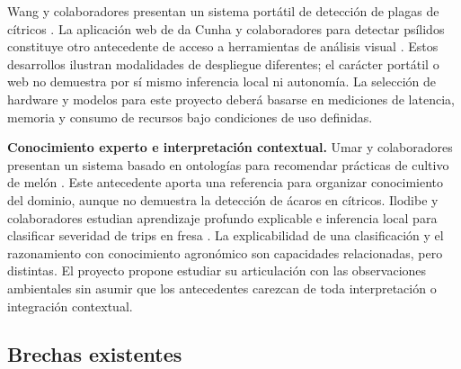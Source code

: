 Wang y colaboradores presentan un sistema portátil de detección de plagas de
cítricos \cite{wang2021portable}. La aplicación web de da Cunha y colaboradores
para detectar psílidos constituye otro antecedente de acceso a herramientas
de análisis visual \cite{cunha2024psyllid}. Estos desarrollos ilustran
modalidades de despliegue diferentes; el carácter portátil o web no demuestra
por sí mismo inferencia local ni autonomía. La selección de hardware y modelos
para este proyecto deberá basarse en mediciones de latencia, memoria y consumo
de recursos bajo condiciones de uso definidas.

\textbf{Conocimiento experto e interpretación contextual.}
Umar y colaboradores presentan un sistema basado en ontologías para recomendar
prácticas de cultivo de melón \cite{umar2024ontology}. Este antecedente aporta
una referencia para organizar conocimiento del dominio, aunque no demuestra
la detección de ácaros en cítricos. Ilodibe y colaboradores estudian aprendizaje
profundo explicable e inferencia local para clasificar severidad de trips en
fresa \cite{ilodibe2026thrips}. La explicabilidad de una clasificación y el
razonamiento con conocimiento agronómico son capacidades relacionadas, pero
distintas. El proyecto propone estudiar su articulación con las observaciones
ambientales sin asumir que los antecedentes carezcan de toda interpretación
o integración contextual.

\subsection{Brechas existentes}
\label{subsec:brechas}

